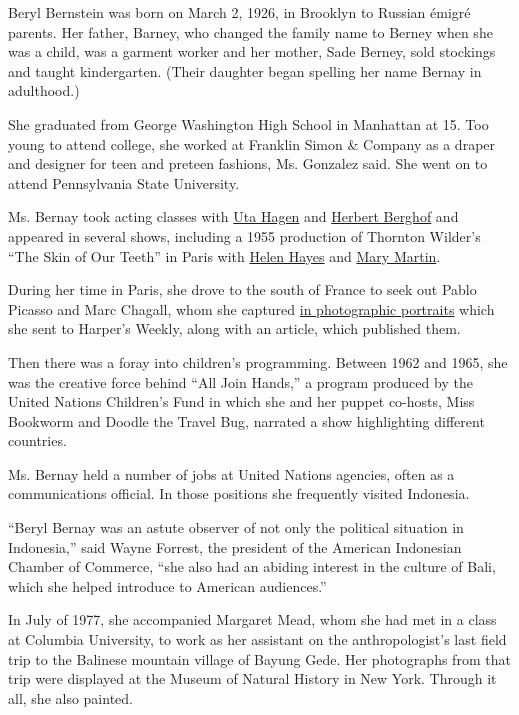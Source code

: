 Beryl Bernstein was born on March 2, 1926, in Brooklyn to Russian émigré
parents. Her father, Barney, who changed the family name to Berney when
she was a child, was a garment worker and her mother, Sade Berney, sold
stockings and taught kindergarten. (Their daughter began spelling her
name Bernay in adulthood.)

She graduated from George Washington High School in Manhattan at 15. Too
young to attend college, she worked at Franklin Simon \& Company as a
draper and designer for teen and preteen fashions, Ms. Gonzalez said.
She went on to attend Pennsylvania State University.

Ms. Bernay took acting classes with
\href{https://www.backstage.com/magazine/article/the-definitive-guide-to-uta-hagens-acting-technique-68922/}{Uta
Hagen} and \href{https://www.imdb.com/name/nm0074596/}{Herbert Berghof}
and appeared in several shows, including a 1955 production of Thornton
Wilder's ``The Skin of Our Teeth'' in Paris with
\href{https://www.biography.com/actor/helen-hayes}{Helen Hayes} and
\href{https://www.masterworksbroadway.com/artist/mary-martin/}{Mary
Martin}.

During her time in Paris, she drove to the south of France to seek out
Pablo Picasso and Marc Chagall, whom she captured
\href{https://www.thevillager.com/2004/10/westbeth-artist-reveals-a-remarkable-life/}{in
photographic portraits} which she sent to Harper's Weekly, along with an
article, which published them.

Then there was a foray into children's programming. Between 1962 and
1965, she was the creative force behind ``All Join Hands,'' a program
produced by the United Nations Children's Fund in which she and her
puppet co-hosts, Miss Bookworm and Doodle the Travel Bug, narrated a
show highlighting different countries.

Ms. Bernay held a number of jobs at United Nations agencies, often as a
communications official. In those positions she frequently visited
Indonesia.

``Beryl Bernay was an astute observer of not only the political
situation in Indonesia,'' said Wayne Forrest, the president of the
American Indonesian Chamber of Commerce, ``she also had an abiding
interest in the culture of Bali, which she helped introduce to American
audiences.''

In July of 1977, she accompanied Margaret Mead, whom she had met in a
class at Columbia University, to work as her assistant on the
anthropologist's last field trip to the Balinese mountain village of
Bayung Gede. Her photographs from that trip were displayed at the Museum
of Natural History in New York. Through it all, she also painted.

